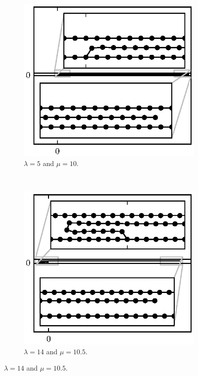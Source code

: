 {	\begin{figure}[h!]
		\centering
		\begin{subfigure}{.5\textwidth}
			\centering
			\includegraphics{./fig/ch3/push/ref/l5_m10.eps}
			\caption{$\lambda=5$ and $\mu=10$.\label{subfig:flattened}}
		\end{subfigure}%
		~
		\begin{subfigure}{.5\textwidth}
			\centering
			\includegraphics{./fig/ch3/push/ref/l14_m10.5.eps}
			\caption{$\lambda=14$ and $\mu=10.5$. \label{subfig:flat_loop}}
		\end{subfigure}


\end{figure}}
